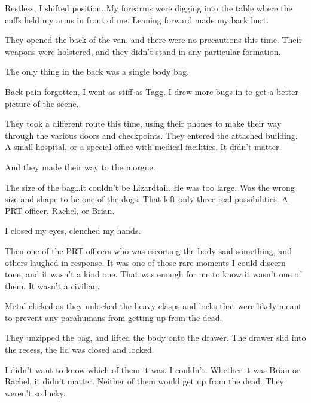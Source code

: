 Restless, I shifted position.  My forearms were digging into the table where the cuffs held my arms in front of me.  Leaning forward made my back hurt.



They opened the back of the van, and there were no precautions this time.  Their weapons were holstered, and they didn't stand in any particular formation.



The only thing in the back was a single body bag.



Back pain forgotten, I went as stiff as Tagg.  I drew more bugs in to get a better picture of the scene.



They took a different route this time, using their phones to make their way through the various doors and checkpoints.  They entered the attached building.  A small hospital, or a special office with medical facilities.  It didn't matter.



And they made their way to the morgue.



The size of the bag\ldots it couldn't be Lizardtail.  He was too large.  Was the wrong size and shape to be one of the dogs.  That left only three real possibilities.  A PRT officer, Rachel, or Brian.



I closed my eyes, clenched my hands.



Then one of the PRT officers who was escorting the body said something, and others laughed in response.  It was one of those rare moments I could discern tone, and it wasn't a kind one.  That was enough for me to know it wasn't one of them.  It wasn't a civilian.



Metal clicked as they unlocked the heavy clasps and locks that were likely meant to prevent any parahumans from getting up from the dead.



They unzipped the bag, and lifted the body onto the drawer.  The drawer slid into the recess, the lid was closed and locked.



I didn't want to know which of them it was.  I couldn't. Whether it was Brian or Rachel, it didn't matter.  Neither of them would get up from the dead.  They weren't so lucky.



